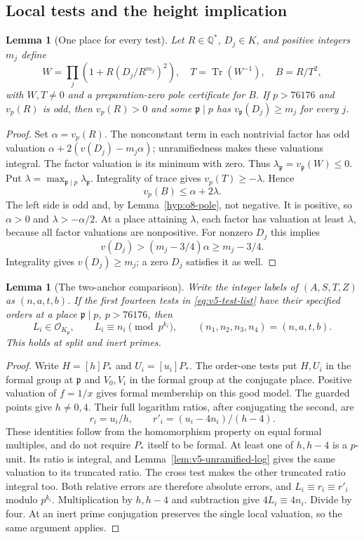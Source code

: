 \documentclass[11pt]{article}
\newtheorem{lemma}[theorem]{Lemma}
\theoremstyle{definition}
\theoremstyle{remark}
\newcommand{\Q}{\mathbb Q}
\newcommand{\Tr}{\operatorname{Tr}}
\begin{document}
\subsection{Local tests and the height implication}
\label{subsec:v5-soundness}

\begin{lemma}[One place for every test]\label{lem:v5-one-place}
Let $R\in\Q^*$, $D_j\in K$, and positive integers $m_j$ define
\[
 W=\prod_j(1+R(D_j/R^{m_j})^2),\quad
 T=\Tr(W^{-1}),\quad B=R/T^2,
\]
with $W,T\ne0$ and a preparation-zero pole certificate for $B$.
If $p>76176$ and $v_p(R)$ is odd, then $v_p(R)>0$ and some
$\mathfrak p\mid p$ has $v_{\mathfrak p}(D_j)\ge m_j$ for every $j$.
\end{lemma}
\begin{proof}
Set $\alpha=v_p(R)$. The nonconstant term in each nontrivial factor
has odd valuation $\alpha+2(v(D_j)-m_j\alpha)$; unramifiedness
makes these valuations integral. The factor valuation is its minimum
with zero. Thus $\lambda_{\mathfrak p}=v_{\mathfrak p}(W)\le0$.
Put $\lambda=\max_{\mathfrak p\mid p}\lambda_{\mathfrak p}$.
Integrality of trace gives $v_p(T)\ge-\lambda$. Hence
\[
 v_p(B)\le\alpha+2\lambda.
\]
The left side is odd and, by Lemma~\ref{hyp:o8-pole}, not negative.
It is positive, so $\alpha>0$ and $\lambda>-\alpha/2$.
At a place attaining $\lambda$, each factor has valuation at least
$\lambda$, because all factor valuations are nonpositive. For
nonzero $D_j$ this implies
\[
 v(D_j)>(m_j-3/4)\alpha\ge m_j-3/4.
\]
Integrality gives $v(D_j)\ge m_j$; a zero $D_j$ satisfies it as well.
\end{proof}

\begin{lemma}[The two-anchor comparison]\label{lem:v5-two-anchors}
Write the integer labels of $(A,S,T,Z)$ as $(n,a,t,b)$.
If the first fourteen tests in \eqref{eq:v5-test-list} have their
specified orders at a place $\mathfrak p\mid p$, $p>76176$, then
\[
 L_i\in\mathcal O_{K_{\mathfrak p}},\qquad
 L_i\equiv n_i\pmod{p^{k_i}},\qquad
 (n_1,n_2,n_3,n_4)=(n,a,t,b).
\]
This holds at split and inert primes.
\end{lemma}
\begin{proof}
Write $H=[h]P_*$ and $U_i=[u_i]P_*$. The order-one tests put
$H,U_i$ in the formal group at $\mathfrak p$ and $V_0,V_i$ in the
formal group at the conjugate place. Positive valuation of $f=1/x$
gives formal membership on this good model. The guarded points give
$h\ne0,4$. Their full logarithm ratios, after conjugating the second,
are
\[
 r_i=u_i/h,\qquad r'_i=(u_i-4n_i)/(h-4).
\]
These identities follow from the homomorphism property on equal
formal multiples, and do not require $P_*$ itself to be formal.
At least one of $h,h-4$ is a $p$-unit. Its ratio is integral, and
Lemma~\ref{lem:v5-unramified-log} gives the same valuation to its
truncated ratio. The cross test makes the other truncated ratio
integral too. Both relative errors are therefore absolute errors,
and $L_i\equiv r_i\equiv r'_i$ modulo $p^{k_i}$. Multiplication
by $h,h-4$ and subtraction give $4L_i\equiv4n_i$. Divide by four.
At an inert prime conjugation preserves the single local valuation,
so the same argument applies.
\end{proof}
\end{document}
